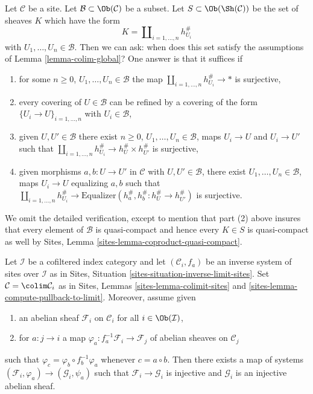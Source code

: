 \begin{remark}
\label{remark-colim-global}
Let $\mathcal{C}$ be a site. Let $\mathcal{B} \subset \Ob(\mathcal{C})$
be a subset. Let $S \subset \Ob(\Sh(\mathcal{C}))$
be the set of sheaves $K$ which have the form
$$
K = \coprod\nolimits_{i = 1, \ldots, n} h_{U_i}^\#
$$
with $U_1, \ldots, U_n \in \mathcal{B}$. Then we can
ask: when does this set satisfy the assumptions of
Lemma \ref{lemma-colim-global}? One answer is that it suffices if
\begin{enumerate}
\item for some $n \geq 0$, $U_1, \ldots, U_n \in \mathcal{B}$
the map $\coprod_{i = 1, \ldots, n} h_{U_i}^\# \to *$ is surjective,
\item every covering of $U \in \mathcal{B}$ can be refined
by a covering of the form $\{U_i \to U\}_{i = 1, \ldots, n}$
with $U_i \in \mathcal{B}$,
\item given $U, U' \in \mathcal{B}$ there exist $n \geq 0$,
$U_1, \ldots, U_n \in \mathcal{B}$, maps $U_i \to U$ and
$U_i \to U'$ such that $\coprod_{i = 1, \ldots, n} h_{U_i}^\# \to
h_U^\# \times h_{U'}^\#$ is surjective,
\item given morphisms $a, b : U \to U'$ in $\mathcal{C}$ with
$U, U' \in \mathcal{B}$, there exist $U_1, \ldots, U_n \in \mathcal{B}$,
maps $U_i \to U$ equalizing $a, b$ such that
$\coprod_{i = 1, \ldots, n} h_{U_i}^\# \to
\text{Equalizer}(h_a^\#, h_b^\# : h_U^\# \to h_{U'}^\#)$
is surjective.
\end{enumerate}
We omit the detailed verification, except to mention that part (2)
above insures that every element of $\mathcal{B}$ is quasi-compact
and hence every $K \in S$ is quasi-compact as well by
Sites, Lemma \ref{sites-lemma-coproduct-quasi-compact}.
\end{remark}

\begin{lemma}
\label{lemma-colim-sites-injective}
Let $\mathcal{I}$ be a cofiltered index category and let
$(\mathcal{C}_i, f_a)$ be an inverse system of sites over $\mathcal{I}$
as in Sites, Situation \ref{sites-situation-inverse-limit-sites}.
Set $\mathcal{C} = \colim \mathcal{C}_i$ as in Sites,
Lemmas \ref{sites-lemma-colimit-sites} and
\ref{sites-lemma-compute-pullback-to-limit}.
Moreover, assume given
\begin{enumerate}
\item an abelian sheaf $\mathcal{F}_i$ on $\mathcal{C}_i$ for all
$i \in \Ob(\mathcal{I})$,
\item for $a : j \to i$ a map
$\varphi_a : f_a^{-1}\mathcal{F}_i \to \mathcal{F}_j$
of abelian sheaves on $\mathcal{C}_j$
\end{enumerate}
such that $\varphi_c = \varphi_b \circ f_b^{-1}\varphi_a$
whenever $c = a \circ b$. Then there exists a map of systems
$(\mathcal{F}_i, \varphi_a) \to (\mathcal{G}_i, \psi_a)$
such that $\mathcal{F}_i \to \mathcal{G}_i$ is injective and
$\mathcal{G}_i$ is an injective abelian sheaf.
\end{lemma}

